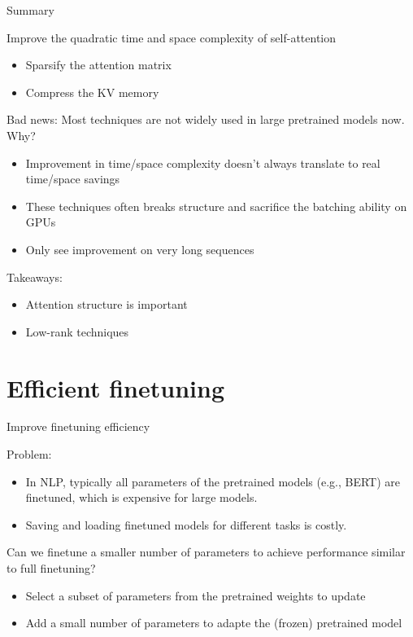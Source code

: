 \documentclass[usenames,dvipsnames,notes,11pt,aspectratio=169,hyperref={colorlinks=true, linkcolor=blue}]{beamer}
\begin{document}
\begin{frame}
    {Summary}

    Improve the quadratic time and space complexity of self-attention\\
    \begin{itemize}
        \item Sparsify the attention matrix
        \item Compress the KV memory
    \end{itemize}

    \pause
    Bad news: Most techniques are not widely used in large pretrained models now. Why?\\
    \begin{itemize}
        \item Improvement in time/space complexity doesn't always translate to real time/space savings
        \item These techniques often breaks structure and sacrifice the batching ability on GPUs
        \item Only see improvement on very long sequences
    \end{itemize}

    \pause
    Takeaways:\\
    \begin{itemize}
        \item Attention structure is important
        \item Low-rank techniques
    \end{itemize}
\end{frame}

\section{Efficient finetuning}

\begin{frame}
    {Improve finetuning efficiency}

    Problem:\\
    \begin{itemize}
        \item In NLP, typically all parameters of the pretrained models (e.g., BERT) are finetuned, which is expensive for large models.
        \item Saving and loading finetuned models for different tasks is costly.
    \end{itemize}
    \pause

    Can we finetune a smaller number of parameters to achieve performance similar to full finetuning?\\\pause
    \begin{itemize}
        \item Select a subset of parameters from the pretrained weights to update 
        \item Add a small number of parameters to adapte the (frozen) pretrained model
    \end{itemize}
\end{frame}
\end{document}
